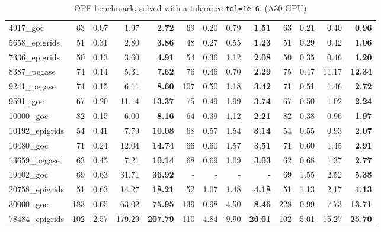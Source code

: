 \begin{table}[!ht]
{\begin{tabular}{|l|rrr >{\bfseries}r|rrr >{\bfseries}r|rrr >{\bfseries}r|}
              \hline
        4917\_goc & 63 & 0.07 & 1.97 & 2.72 & 69 & 0.20 & 0.79 & 1.51 & 63 & 0.21 & 0.40 & 0.96 \\
        5658\_epigrids & 51 & 0.31 & 2.80 & 3.86 & 48 & 0.27 & 0.55 & 1.23 & 51 & 0.29 & 0.42 & 1.06 \\
        7336\_epigrids & 50 & 0.13 & 3.60 & 4.91 & 54 & 0.36 & 1.12 & 2.08 & 50 & 0.35 & 0.46 & 1.20 \\
        8387\_pegase & 74 & 0.14 & 5.31 & 7.62 & 76 & 0.46 & 0.70 & 2.29 & 75 & 0.47 & 11.17 & 12.34 \\
        9241\_pegase & 74 & 0.15 & 6.11 & 8.60 & 107 & 0.50 & 1.18 & 3.42 & 71 & 0.51 & 1.46 & 2.72 \\
              \hline
        9591\_goc & 67 & 0.20 & 11.14 & 13.37 & 75 & 0.49 & 1.99 & 3.74 & 67 & 0.50 & 1.02 & 2.24 \\
        10000\_goc & 82 & 0.15 & 6.00 & 8.16 & 64 & 0.39 & 1.12 & 2.21 & 82 & 0.38 & 0.96 & 1.97 \\
        10192\_epigrids & 54 & 0.41 & 7.79 & 10.08 & 68 & 0.57 & 1.54 & 3.14 & 54 & 0.55 & 0.93 & 2.07 \\
        10480\_goc & 71 & 0.24 & 12.04 & 14.74 & 66 & 0.60 & 1.57 & 3.51 & 71 & 0.60 & 1.45 & 2.91 \\
        13659\_pegase & 63 & 0.45 & 7.21 & 10.14 & 68 & 0.69 & 1.09 & 3.03 & 62 & 0.68 & 1.37 & 2.77 \\
              \hline
        19402\_goc & 69 & 0.63 & 31.71 & 36.92 & - & - & - & - & 69 & 1.55 & 2.52 & 5.38 \\
        20758\_epigrids & 51 & 0.63 & 14.27 & 18.21 & 52 & 1.07 & 1.48 & 4.18 & 51 & 1.13 & 2.17 & 4.13 \\
        30000\_goc & 183 & 0.65 & 63.02 & 75.95 & 139 & 0.98 & 4.50 & 8.46 & 228 & 0.99 & 7.73 & 13.71 \\
        78484\_epigrids & 102 & 2.57 & 179.29 & 207.79 & 110 & 4.84 & 9.90 & 26.01 & 102 & 5.01 & 15.27 & 25.70 \\
			\hline
		\end{tabular}
  }
  \caption{OPF benchmark, solved with a tolerance {\tt tol=1e-6}. (A30 GPU) \label{tab:opf:benchmark}}
\end{table}

